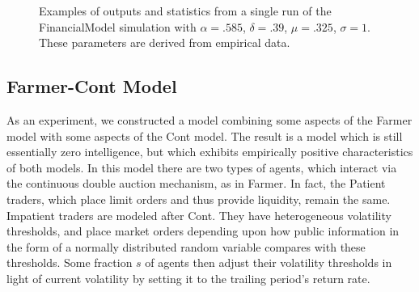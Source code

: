 \documentclass[runningheads]{llncs}
\begin{document}
\begin{figure}[htbp]
\begin{center}
{
      }
    \caption{Examples of outputs and statistics from a single run of the FinancialModel simulation with $\alpha=.585$, $\delta=.39$, $\mu=.325$, $\sigma=1$. These parameters are derived from empirical data.}
    \label{fig:dynamicsFarmerNonLog}
  \end{center}
\end{figure}


\subsection{Farmer-Cont Model}

As an experiment, we constructed a model combining some aspects of the Farmer model with some aspects of the Cont model. The result is a model which is still essentially zero intelligence, but which exhibits empirically positive characteristics of both models. In this model there are two types of agents, which interact via the continuous double auction mechanism, as in Farmer. In fact, the Patient traders, which place limit orders and thus provide liquidity, remain the same. Impatient traders are modeled after Cont. They have heterogeneous volatility thresholds, and place market orders depending upon how public information in the form of a normally distributed random variable compares with these thresholds. Some fraction $s$ of agents then adjust their volatility thresholds in light of current volatility by setting it to the trailing period's return rate.
\end{document}
